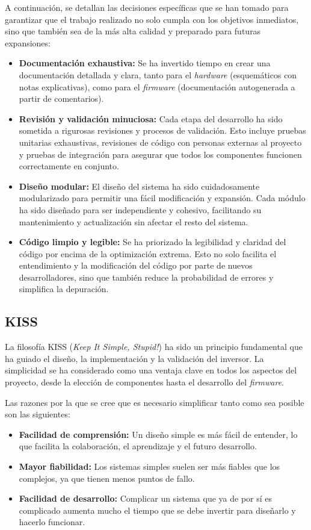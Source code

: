 A continuación, se detallan las decisiones específicas que se han tomado para garantizar que el trabajo realizado no solo cumpla con los objetivos inmediatos, sino que también sea de la más alta calidad y preparado para futuras expansiones:

\begin{itemize}
	\item \textbf{Documentación exhaustiva:} Se ha invertido tiempo en crear una documentación detallada y clara, tanto para el \textit{hardware} (esquemáticos con notas explicativas), como para el \textit{firmware} (documentación autogenerada a partir de comentarios).
	
	\item \textbf{Revisión y validación minuciosa:} Cada etapa del desarrollo ha sido sometida a rigurosas revisiones y procesos de validación. Esto incluye pruebas unitarias exhaustivas, revisiones de código con personas externas al proyecto y pruebas de integración para asegurar que todos los componentes funcionen correctamente en conjunto.
	
	\item \textbf{Diseño modular:} El diseño del sistema ha sido cuidadosamente modularizado para permitir una fácil modificación y expansión. Cada módulo ha sido diseñado para ser independiente y cohesivo, facilitando su mantenimiento y actualización sin afectar el resto del sistema.
	
	\item \textbf{Código limpio y legible:} Se ha priorizado la legibilidad y claridad del código por encima de la optimización extrema. Esto no solo facilita el entendimiento y la modificación del código por parte de nuevos desarrolladores, sino que también reduce la probabilidad de errores y simplifica la depuración.
\end{itemize}

\subsection{KISS}
La filosofía KISS (\textit{Keep It Simple, Stupid!}) \cite{KISS} ha sido un principio fundamental que ha guiado el diseño, la implementación y la validación del inversor. La simplicidad se ha considerado como una ventaja clave en todos los aspectos del proyecto, desde la elección de componentes hasta el desarrollo del \textit{firmware}.

Las razones por la que se cree que es necesario simplificar tanto como sea posible son las siguientes:
\begin{itemize}
	\item \textbf{Facilidad de comprensión:} Un diseño simple es más fácil de entender, lo que facilita la colaboración, el aprendizaje y el futuro desarrollo.
	\item \textbf{Mayor fiabilidad:} Los sistemas simples suelen ser más fiables que los complejos, ya que tienen menos puntos de fallo.
	\item \textbf{Facilidad de desarrollo:} Complicar un sistema que ya de por sí es complicado aumenta mucho el tiempo que se debe invertir para diseñarlo y hacerlo funcionar.
\end{itemize}

